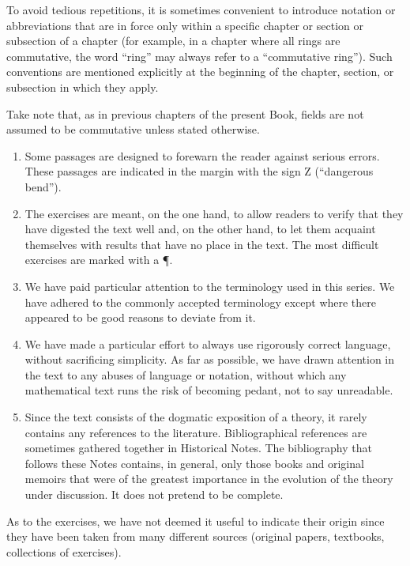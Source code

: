 To avoid tedious repetitions, it is sometimes convenient to introduce notation or abbreviations that are in force only within a specific chapter or section or subsection of a chapter (for example, in a chapter where all rings are commutative, the word ``ring'' may always refer to a ``commutative ring''). Such conventions are mentioned explicitly at the beginning of the chapter, section, or subsection in which they apply.

Take note that, as in previous chapters of the present Book, fields are not assumed to be commutative unless stated otherwise.

\begin{enumerate}
\def\labelenumi{\arabic{enumi}.}
\setcounter{enumi}{6}
\item
  Some passages are designed to forewarn the reader against serious errors. These passages are indicated in the margin with the sign Z (``dangerous bend'').
\item
  The exercises are meant, on the one hand, to allow readers to verify that they have digested the text well and, on the other hand, to let them acquaint themselves with results that have no place in the text. The most difficult exercises are marked with a ¶.
\item
  We have paid particular attention to the terminology used in this series. We have adhered to the commonly accepted terminology except where there appeared to be good reasons to deviate from it.
\item
  We have made a particular effort to always use rigorously correct language, without sacrificing simplicity. As far as possible, we have drawn attention in the text to any abuses of language or notation, without which any mathematical text runs the risk of becoming pedant, not to say unreadable.
\item
  Since the text consists of the dogmatic exposition of a theory, it rarely contains any references to the literature. Bibliographical references are sometimes gathered together in Historical Notes. The bibliography that follows these Notes contains, in general, only those books and original memoirs that were of the greatest importance in the evolution of the theory under discussion. It does not pretend to be complete.
\end{enumerate}

As to the exercises, we have not deemed it useful to indicate their origin since they have been taken from many different sources (original papers, textbooks, collections of exercises).

